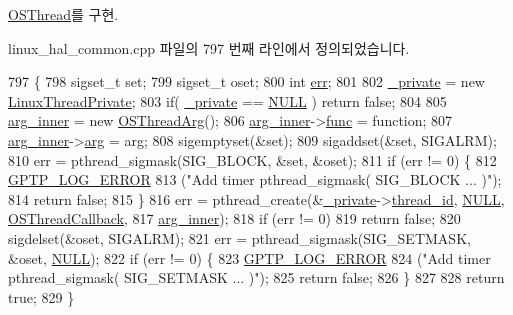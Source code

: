 \hyperlink{class_o_s_thread_a016d9f5a1958871bb32efd99100dcbc3}{O\+S\+Thread}를 구현.



linux\+\_\+hal\+\_\+common.\+cpp 파일의 797 번째 라인에서 정의되었습니다.


\begin{DoxyCode}
797                                                             \{
798     sigset\_t \textcolor{keyword}{set};
799     sigset\_t oset;
800     \textcolor{keywordtype}{int} \hyperlink{gst__avb__playbin_8c_a6ce68847c12434f60d1b2654a3dc3409}{err};
801 
802     \hyperlink{class_linux_thread_ad25964f3bb9f697a3c24ce8805e7806a}{\_private} = \textcolor{keyword}{new} \hyperlink{struct_linux_thread_private}{LinuxThreadPrivate};
803     \textcolor{keywordflow}{if}( \hyperlink{class_linux_thread_ad25964f3bb9f697a3c24ce8805e7806a}{\_private} == \hyperlink{openavb__types__base__pub_8h_a070d2ce7b6bb7e5c05602aa8c308d0c4}{NULL} ) \textcolor{keywordflow}{return} \textcolor{keyword}{false};
804 
805     \hyperlink{class_linux_thread_af6992b2f52fbe4a2362f1f0a81371185}{arg\_inner} = \textcolor{keyword}{new} \hyperlink{struct_o_s_thread_arg}{OSThreadArg}();
806     \hyperlink{class_linux_thread_af6992b2f52fbe4a2362f1f0a81371185}{arg\_inner}->\hyperlink{struct_o_s_thread_arg_a8eac03f92af0136b0d3570a5fd522d0b}{func} = \textcolor{keyword}{function};
807     \hyperlink{class_linux_thread_af6992b2f52fbe4a2362f1f0a81371185}{arg\_inner}->\hyperlink{struct_o_s_thread_arg_ae036856e415526e58e249638733f6752}{arg} = arg;
808     sigemptyset(&\textcolor{keyword}{set});
809     sigaddset(&\textcolor{keyword}{set}, SIGALRM);
810     err = pthread\_sigmask(SIG\_BLOCK, &\textcolor{keyword}{set}, &oset);
811     \textcolor{keywordflow}{if} (err != 0) \{
812         \hyperlink{gptp__log_8hpp_afefbb1009717c128012bfeed94842987}{GPTP\_LOG\_ERROR}
813             (\textcolor{stringliteral}{"Add timer pthread\_sigmask( SIG\_BLOCK ... )"});
814         \textcolor{keywordflow}{return} \textcolor{keyword}{false};
815     \}
816     err = pthread\_create(&\hyperlink{class_linux_thread_ad25964f3bb9f697a3c24ce8805e7806a}{\_private}->\hyperlink{struct_linux_thread_private_a614409619094fd8c0c6b522c400ffeea}{thread\_id}, \hyperlink{openavb__types__base__pub_8h_a070d2ce7b6bb7e5c05602aa8c308d0c4}{NULL}, 
      \hyperlink{linux__hal__common_8cpp_a97e1788440e68cf94628a34e5e1bf3b4}{OSThreadCallback},
817                          \hyperlink{class_linux_thread_af6992b2f52fbe4a2362f1f0a81371185}{arg\_inner});
818     \textcolor{keywordflow}{if} (err != 0)
819         \textcolor{keywordflow}{return} \textcolor{keyword}{false};
820     sigdelset(&oset, SIGALRM);
821     err = pthread\_sigmask(SIG\_SETMASK, &oset, \hyperlink{openavb__types__base__pub_8h_a070d2ce7b6bb7e5c05602aa8c308d0c4}{NULL});
822     \textcolor{keywordflow}{if} (err != 0) \{
823         \hyperlink{gptp__log_8hpp_afefbb1009717c128012bfeed94842987}{GPTP\_LOG\_ERROR}
824             (\textcolor{stringliteral}{"Add timer pthread\_sigmask( SIG\_SETMASK ... )"});
825         \textcolor{keywordflow}{return} \textcolor{keyword}{false};
826     \}
827 
828     \textcolor{keywordflow}{return} \textcolor{keyword}{true};
829 \}
\end{DoxyCode}



